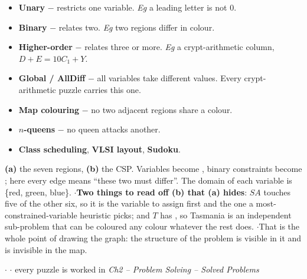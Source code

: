 {
\begin{itemize}
  \item \textbf{Unary} $-$ restricts one variable. \emph{Eg} a leading letter is not 0.
  \item \textbf{Binary} $-$ relates two. \emph{Eg} two regions differ in colour.
  \item \textbf{Higher-order} $-$ relates three or more. \emph{Eg} a crypt-arithmetic
        column, $D + E = 10C_1 + Y$.
  \item \textbf{Global / AllDiff} $-$ all variables take different values. Every
        crypt-arithmetic puzzle carries this one.
\end{itemize}
\begin{itemize}
  \item \textbf{Map colouring} $-$ no two adjacent regions share a colour.
  \item \textbf{$n$-queens} $-$ no queen attacks another.
  \item \textbf{Class scheduling}, \textbf{VLSI layout}, \textbf{Sudoku}.
\end{itemize}}

\vspace{3pt}
{\color{sub}\footnotesize \textbf{(a)} the seven regions, \textbf{(b)} the CSP. Variables
become , binary constraints become ;
here every edge means ``these two must differ''. The domain of each variable is
\{red, green, blue\}. \gap$\cdot$\gap \textbf{Two things to read off (b) that (a) hides}:
$SA$ touches five of the other six, so it is the variable to assign first and the one a
most-constrained-variable heuristic picks; and $T$ has , so Tasmania is an independent sub-problem that can be coloured any
colour whatever the rest does. \gap$\cdot$\gap That is the whole point of drawing the
graph: the structure of the problem is visible in it and is invisible in the map.}

\vspace{2pt}

{\color{sub}\footnotesize {} \gap$\cdot$\gap
{} \gap$\cdot$\gap
every puzzle is worked in \emph{Ch2 -- Problem Solving -- Solved Problems}}

